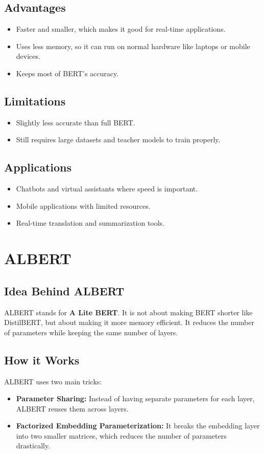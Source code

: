 \documentclass[11pt]{article}
\begin{document}
\subsection{Advantages}
\begin{itemize}
    \item Faster and smaller, which makes it good for real-time applications.
    \item Uses less memory, so it can run on normal hardware like laptops or mobile devices.
    \item Keeps most of BERT’s accuracy.
\end{itemize}

\subsection{Limitations}
\begin{itemize}
    \item Slightly less accurate than full BERT.
    \item Still requires large datasets and teacher models to train properly.
\end{itemize}

\subsection{Applications}
\begin{itemize}
    \item Chatbots and virtual assistants where speed is important.
    \item Mobile applications with limited resources.
    \item Real-time translation and summarization tools.
\end{itemize}

\section{ALBERT}
\subsection{Idea Behind ALBERT}
ALBERT stands for \textbf{A Lite BERT}. 
It is not about making BERT shorter like DistilBERT, but about making it more memory efficient. 
It reduces the number of parameters while keeping the same number of layers.

\subsection{How it Works}
ALBERT uses two main tricks:
\begin{itemize}
    \item \textbf{Parameter Sharing:} Instead of having separate parameters for each layer, ALBERT reuses them across layers.
    \item \textbf{Factorized Embedding Parameterization:} It breaks the embedding layer into two smaller matrices, which reduces the number of parameters drastically.
\end{itemize}
\end{document}
